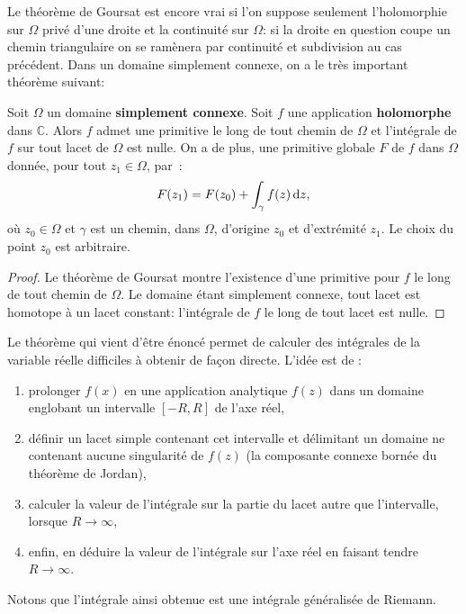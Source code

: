 Le théorème de Goursat est encore vrai si l'on suppose seulement l'holomorphie
sur $\Omega$ privé d'une droite et la continuité sur $\Omega$: si la droite en
question coupe un chemin triangulaire on se ramènera par continuité et
subdivision au cas précédent. Dans un domaine simplement connexe, on a le très important théorème suivant:

\begin{fthm}
Soit $\Omega$ un domaine \textbf{simplement connexe}. Soit $f$ une application \textbf{holomorphe}
dans $\mathbb{C}$. Alors $f$ admet une primitive le long de tout chemin de
$\Omega$ et l'intégrale de $f$ sur tout lacet de $\Omega$ est nulle. On a de plus, une primitive globale $F$ de $f$ dans $\Omega$ donnée, pour tout $z_1 \in \Omega$, par~:
\[F(z_1)= F(z_0) + \int_\gamma f(z) \mathop{}\mathopen{}\mathrm{d} z,\]
où $z_0 \in \Omega$ et $\gamma$ est un chemin,  dans $\Omega$, d'origine $z_0$ et d'extrémité $z_1$. Le choix du point $z_0$ est arbitraire.


\end{fthm}

\begin{proof}
Le théorème de Goursat montre l'existence d'une primitive pour $f$ le long de
tout chemin de $\Omega$. Le domaine étant simplement connexe, tout lacet est
homotope à un lacet constant: l'intégrale de $f$ le long de tout lacet est
nulle.
\end{proof}

Le théorème qui vient d'être énoncé permet de calculer des intégrales de la
variable réelle difficiles à obtenir de façon directe. L'idée est de :
\begin{enumerate}
    \item prolonger $f(x)$ en une application analytique $f(z)$ dans un domaine englobant un intervalle $[-R,R]$ de l'axe réel,
    \item définir un lacet simple contenant cet intervalle et délimitant un domaine ne contenant aucune singularité de $f(z)$ (la composante connexe bornée du théorème de Jordan),
    \item calculer la valeur de l'intégrale sur la partie du lacet autre que l'intervalle, lorsque $R \to \infty$,
    \item enfin, en déduire la valeur de l'intégrale sur l'axe réel en faisant tendre $R \to \infty$.
\end{enumerate}
Notons que l'intégrale ainsi obtenue est une intégrale généralisée de Riemann. 

